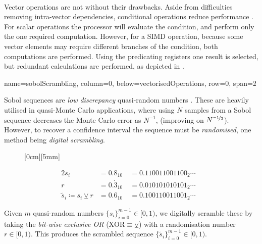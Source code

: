 \documentclass[a0paper,portrait,fontscale=0.40]{baposter}
\begin{document}
\begin{poster}
{\begin{Figure}
	\centering
	 \\[1em]
	\label{fig:sve_registers}
\end{Figure}


Vector operations are not without their drawbacks. Aside from difficulties removing intra-vector dependencies, conditional operations reduce performance \citep[pg.\,22--27]{loshin2001efficient}. For scalar operations the processor will evaluate the condition, and perform only the one required computation. However, for a SIMD operation, because some vector elements may require different branches of the condition, both computations are performed. Using the predicating registers one result is selected, but redundant calculations are performed, as depicted in .


\begin{Figure}
	\centering
	\label{fig:simd_branching}
\end{Figure}

}



  {name=sobolScrambling, column=0, below=vectorisedOperations, row=0, span=2}
  {

	Sobol sequences are \textit{low discrepancy} quasi-random numbers \citep[5.2.3]{glasserman2013monte}. These are heavily utilised in quasi-Monte Carlo applications, where using $ N $ samples from a Sobol sequence decreases the Monte Carlo error as $ N^{-1} $, (improving on $ N^{\nicefrac{-1}{2}} $). However, to recover a confidence interval the sequence must be \textit{randomised}, one method being \textit{digital scrambling}. 

			\begin{wrapfigure}{R}{0.4\linewidth}
					\noindent\centering
\raisebox{-0.5em}[0cm][5mm]{\begin{minipage}[c][0.1cm][c]{\linewidth}
				\begin{alignat*}{2}
				s_i           & =  0.8_{10}      \: & = 0.110011001100_2\cdots  &\\
				r             & =  0.\dot{3}_{10} & = 0.010101010101_2\cdots  &\\
				\tilde{s}_i \coloneqq s_i \veebar r & =  0.6_{10}       & = 0.100110011001_2\cdots  &
				\end{alignat*} 
\end{minipage}}
			\end{wrapfigure} 			
	Given $ m $ quasi-random numbers $ \{s_i\}_{i=0}^{m-1} \in [0, 1)$, we digitally scramble these by taking the \textit{bit-wise} \textit{exclusive OR} ($\textrm{XOR} \equiv \veebar  $) with a randomisation number $ r \in [0, 1)$. This produces the scrambled sequence $ \{\tilde{s}_i\}_{i=0}^{m-1} \in [0, 1)$.

}
\end{poster}
\end{document}
